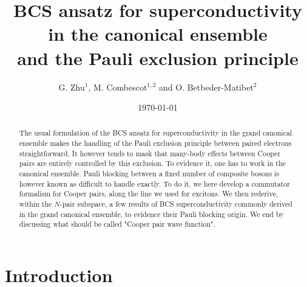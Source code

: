 \documentclass[twocolumn,showpacs]{revtex4}
\begin{document}
\title{\textbf{BCS ansatz for superconductivity in the canonical ensemble\\ and the Pauli exclusion principle}}
\author{G. Zhu$^1$, M. Combescot$^{1,2}$ and O. Betbeder-Matibet$^2$}



\begin{abstract}
The usual formulation of the BCS ansatz for superconductivity in the grand canonical ensemble makes the handling of the Pauli exclusion principle between paired electrons straightforward. It however tends to mask that many-body effects between Cooper pairs are entirely controlled by this exclusion. To evidence it, one has to work in the canonical ensemble. Pauli blocking between a fixed number of composite bosons is however known as difficult to handle exactly. To do it, we here develop a commutator formalism for Cooper pairs, along the line we used for excitons. We then rederive, within the $N$-pair subspace, a few results of BCS superconductivity commonly derived in the grand canonical ensemble, to evidence their Pauli blocking origin. We end by discussing what should be called "Cooper pair wave function".
\end{abstract}

\pacs{}

\date{\today}

\maketitle


\section{Introduction}
\end{document}
